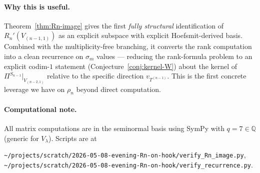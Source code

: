\documentclass[11pt]{article}
\theoremstyle{definition}
\begin{document}
\paragraph{Why this is useful.}
Theorem~\ref{thm:Rn-image} gives the first \emph{fully structural}
identification of $R_n'(V_{(n-1,1)})$ as an explicit subspace with
explicit Hoefsmit-derived basis. Combined with the multiplicity-free
branching, it converts the rank computation into a clean recurrence
on $\sigma_m$ values --- reducing the rank-formula problem to an
explicit codim-$1$ statement
(Conjecture~\ref{conj:kernel-W}) about the kernel of
$\Pi^{S_{n-1}}|_{V_{(n-2,1)}}$ relative to the specific direction
$v_{T^{(n-1)}}$. This is the first concrete leverage we have on
$\rho_n$ beyond direct computation.

\paragraph{Computational note.}
All matrix computations are in the seminormal basis using SymPy with
$q = 7 \in \mathbb{Q}$ (generic for $V_\lambda$). Scripts are at
\begin{center}
\texttt{\textasciitilde/projects/scratch/2026-05-08-evening-Rn-on-hook/verify\_Rn\_image.py}, \\
\texttt{\textasciitilde/projects/scratch/2026-05-08-evening-Rn-on-hook/verify\_recurrence.py}.
\end{center}
\end{document}
